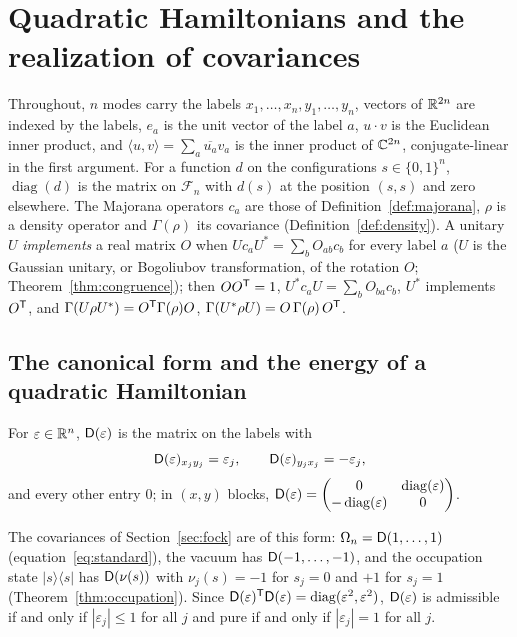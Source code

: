 \section{Quadratic Hamiltonians and the realization of covariances}
\label{sec:hamiltonian}

Throughout, $n$ modes carry the labels $x_1,\ldots,x_n,y_1,\ldots,y_n$, vectors of $\mathbb R^{2n}$
are indexed by the labels, $e_a$ is the unit vector of the label $a$, $u\cdot v$ is the
Euclidean inner product, and $\langle u,v\rangle=\sum_a\overline{u_a}v_a$ is the inner product of
$\mathbb C^{2n}$, conjugate-linear in the first argument. For a function $d$ on the configurations $s\in\{0,1\}^n$,
$\operatorname{diag}(d)$ is the matrix on $\mathcal F_n$ with $d(s)$ at the position $(s,s)$
and zero elsewhere. The Majorana operators $c_a$ are those of Definition~\ref{def:majorana},
$\rho$ is a density operator and $\Gamma(\rho)$ its covariance (Definition~\ref{def:density}).
A unitary $U$ \emph{implements} a real matrix $O$ when
$Uc_aU^*=\sum_bO_{ab}c_b$ for every label $a$ ($U$ is the Gaussian unitary, or Bogoliubov
transformation, of the rotation $O$; Theorem~\ref{thm:congruence}); then
$OO^{\mathsf T}=1$, $U^*c_aU=\sum_bO_{ba}c_b$, $U^*$ implements $O^{\mathsf T}$, and
$\Gamma(U\rho U^*)=O^{\mathsf T}\Gamma(\rho)O$, $\Gamma(U^*\rho U)=O\,\Gamma(\rho)\,O^{\mathsf T}$.

\subsection{The canonical form and the energy of a quadratic Hamiltonian}
\label{sec:blockform}

\begin{definition}\label{def:block}
For $\varepsilon\in\mathbb R^n$, $\mathsf D(\varepsilon)$ is the matrix on the labels with
\[
 \mathsf D(\varepsilon)_{x_jy_j}=\varepsilon_j,\qquad \mathsf D(\varepsilon)_{y_jx_j}=-\varepsilon_j,
\]
and every other entry $0$; in $(x,y)$ blocks,
$\mathsf D(\varepsilon)=\begin{pmatrix}0&\operatorname{diag}(\varepsilon)\\-\operatorname{diag}(\varepsilon)&0\end{pmatrix}$.
\end{definition}
The covariances of Section~\ref{sec:fock} are of this form: $\Omega_n=\mathsf D(1,\ldots,1)$
(equation~\eqref{eq:standard}), the vacuum has $\mathsf D(-1,\ldots,-1)$, and the occupation state $|s\rangle\langle s|$ has $\mathsf D(\nu(s))$ with
$\nu_j(s)=-1$ for $s_j=0$ and $+1$ for $s_j=1$ (Theorem~\ref{thm:occupation}). Since
$\mathsf D(\varepsilon)^{\mathsf T}\mathsf D(\varepsilon)=\operatorname{diag}(\varepsilon^2,\varepsilon^2)$,
$\mathsf D(\varepsilon)$ is admissible if and only if $|\varepsilon_j|\leq1$ for all $j$ and pure if and
only if $|\varepsilon_j|=1$ for all $j$.

